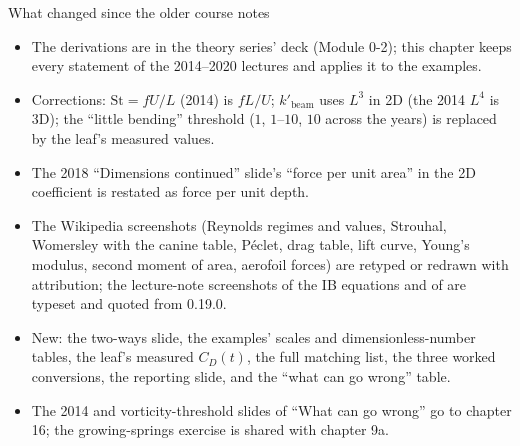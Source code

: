 \documentclass[aspectratio=169,11pt]{beamer}
\begin{document}
\begin{frame}{What changed since the older course notes}
\label{fr:changed}
\small
\begin{itemize}
  \item The derivations are in the theory series' deck (Module 0-2); this chapter keeps every statement of the 2014--2020 lectures and applies it to the examples.
  \item Corrections: $\mathrm{St} = fU/L$ (2014) is $fL/U$; $k'_{\mathrm{beam}}$ uses $L^3$ in 2D (the 2014 $L^4$ is 3D); the ``little bending'' threshold ($1$, $1$--$10$, $10$ across the years) is replaced by the leaf's measured values.
  \item The 2018 ``Dimensions continued'' slide's ``force per unit area'' in the 2D coefficient is restated as force per unit depth.
  \item The Wikipedia screenshots (Reynolds regimes and values, Strouhal, Womersley with the canine table, P\'eclet, drag table, lift curve, Young's modulus, second moment of area, aerofoil forces) are retyped or redrawn with attribution; the lecture-note screenshots of the IB equations and of  are typeset and quoted from 0.19.0.
  \item New: the two-ways slide, the examples' scales and dimensionless-number tables, the leaf's measured $C_D(t)$, the full matching list, the three worked conversions, the reporting slide, and the ``what can go wrong'' table.
  \item The 2014  and vorticity-threshold slides of ``What can go wrong'' go to chapter 16; the growing-springs exercise is shared with chapter 9a.
\end{itemize}
\end{frame}
\end{document}
